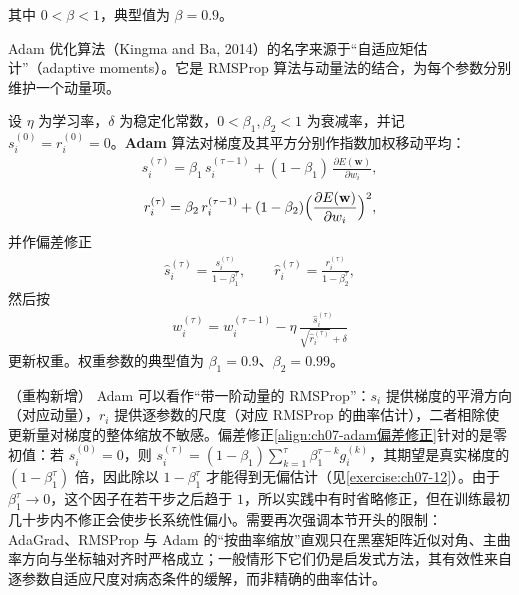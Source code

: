 \documentclass[../../main.tex]{subfiles}
\begin{document}
其中 $0<\beta<1$，典型值为 $\beta=0.9$。

Adam 优化算法（Kingma and Ba, 2014）的名字来源于“自适应矩估计”（adaptive moments）。它是 RMSProp 算法与动量法的结合，为每个参数分别维护一个动量项。

\begin{definition}[Adam]\label{definition:ch07-Adam}
设 $\eta$ 为学习率，$\delta$ 为稳定化常数，$0<\beta_1,\beta_2<1$ 为衰减率，并记 $s_i^{(0)}=r_i^{(0)}=0$。\textbf{Adam} 算法对梯度及其平方分别作指数加权移动平均：
\begin{align}
s_i^{(\tau)} = \beta_1\,s_i^{(\tau-1)}+(1-\beta_1)\,\frac{\partial E(\mathbf{w})}{\partial w_i},
\label{align:ch07-adam一阶矩}
\end{align}
\begin{align}
r_i^{(\tau)} = \beta_2\,r_i^{(\tau-1)}+(1-\beta_2)\Bigl(\frac{\partial E(\mathbf{w})}{\partial w_i}\Bigr)^{2},
\label{align:ch07-adam二阶矩}
\end{align}
并作偏差修正
\begin{align}
\hat{s}_i^{(\tau)} = \frac{s_i^{(\tau)}}{1-\beta_1^{\tau}},\qquad
\hat{r}_i^{(\tau)} = \frac{r_i^{(\tau)}}{1-\beta_2^{\tau}},
\label{align:ch07-adam偏差修正}
\end{align}
然后按
\begin{align}
w_i^{(\tau)} = w_i^{(\tau-1)}-\eta\,\frac{\hat{s}_i^{(\tau)}}{\sqrt{\hat{r}_i^{(\tau)}}+\delta}
\label{align:ch07-adam更新}
\end{align}
更新权重。权重参数的典型值为 $\beta_1=0.9$、$\beta_2=0.99$。
\end{definition}

\begin{remark}（重构新增）
Adam 可以看作“带一阶动量的 RMSProp”：$s_i$ 提供梯度的平滑方向（对应动量），$r_i$ 提供逐参数的尺度（对应 RMSProp 的曲率估计），二者相除使更新量对梯度的整体缩放不敏感。偏差修正\eqref{align:ch07-adam偏差修正}针对的是零初值：若 $s_i^{(0)}=0$，则 $s_i^{(\tau)}=(1-\beta_1)\sum_{k=1}^{\tau}\beta_1^{\tau-k}g_i^{(k)}$，其期望是真实梯度的 $(1-\beta_1^{\tau})$ 倍，因此除以 $1-\beta_1^{\tau}$ 才能得到无偏估计（见\cref{exercise:ch07-12}）。由于 $\beta_1^{\tau}\to0$，这个因子在若干步之后趋于 $1$，所以实践中有时省略修正，但在训练最初几十步内不修正会使步长系统性偏小。需要再次强调本节开头的限制：AdaGrad、RMSProp 与 Adam 的“按曲率缩放”直观只在黑塞矩阵近似对角、主曲率方向与坐标轴对齐时严格成立；一般情形下它们仍是启发式方法，其有效性来自逐参数自适应尺度对病态条件的缓解，而非精确的曲率估计。
\end{remark}
\end{document}
